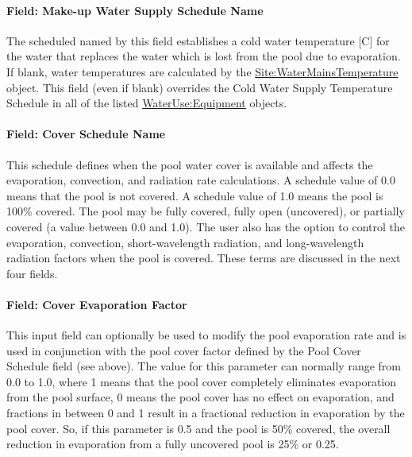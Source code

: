 \paragraph{Field: Make-up Water Supply Schedule Name}\label{field-make-up-water-supply-schedule-name}

The scheduled named by this field establishes a cold water temperature {[}C{]} for the water that replaces the water which is lost from the pool due to evaporation. If blank, water temperatures are calculated by the \hyperref[sitewatermainstemperature]{Site:WaterMainsTemperature} object. This field (even if blank) overrides the Cold Water Supply Temperature Schedule in all of the listed \hyperref[wateruseequipment]{WaterUse:Equipment} objects.

\paragraph{Field: Cover Schedule Name}\label{field-cover-schedule-name}

This schedule defines when the pool water cover is available and affects the evaporation, convection, and radiation rate calculations. A schedule value of 0.0 means that the pool is not covered. A schedule value of 1.0 means the pool is 100\% covered. The pool may be fully covered, fully open (uncovered), or partially covered (a value between 0.0 and 1.0). The user also has the option to control the evaporation, convection, short-wavelength radiation, and long-wavelength radiation factors when the pool is covered. These terms are discussed in the next four fields.

\paragraph{Field: Cover Evaporation Factor}\label{field-cover-evaporation-factor}

This input field can optionally be used to modify the pool evaporation rate and is used in conjunction with the pool cover factor defined by the Pool Cover Schedule field (see above). The value for this parameter can normally range from 0.0 to 1.0, where 1 means that the pool cover completely eliminates evaporation from the pool surface, 0 means the pool cover has no effect on evaporation, and fractions in between 0 and 1 result in a fractional reduction in evaporation by the pool cover. So, if this parameter is 0.5 and the pool is 50\% covered, the overall reduction in evaporation from a fully uncovered pool is 25\% or 0.25.

